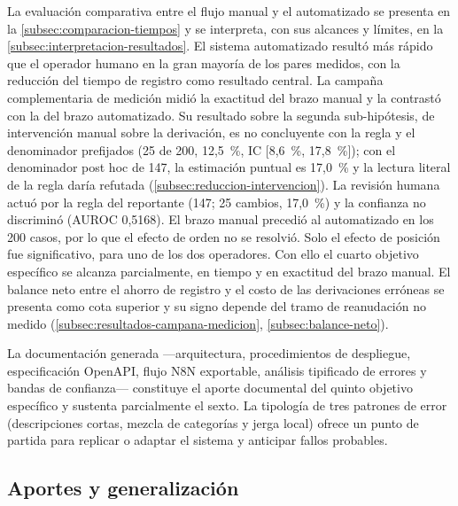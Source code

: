 La evaluación comparativa entre el flujo manual y el automatizado se presenta en la \autoref{subsec:comparacion-tiempos} y se interpreta, con sus alcances y límites, en la \autoref{subsec:interpretacion-resultados}. El sistema automatizado resultó más rápido que el operador humano en la gran mayoría de los pares medidos, con la reducción del tiempo de registro como resultado central. La campaña complementaria de medición midió la exactitud del brazo manual y la contrastó con la del brazo automatizado. Su resultado sobre la segunda sub-hipótesis, de intervención manual sobre la derivación, es no concluyente con la regla y el denominador prefijados (25 de 200, 12,5~\%, IC [8,6~\%, 17,8~\%]); con el denominador post hoc de 147, la estimación puntual es 17,0~\% y la lectura literal de la regla daría refutada (\autoref{subsec:reduccion-intervencion}). La revisión humana actuó por la regla del reportante (147; 25 cambios, 17,0~\%) y la confianza no discriminó (AUROC 0,5168). El brazo manual precedió al automatizado en los 200 casos, por lo que el efecto de orden no se resolvió. Solo el efecto de posición fue significativo, para uno de los dos operadores. Con ello el cuarto objetivo específico se alcanza parcialmente, en tiempo y en exactitud del brazo manual. El balance neto entre el ahorro de registro y el costo de las derivaciones erróneas se presenta como cota superior y su signo depende del tramo de reanudación no medido (\autoref{subsec:resultados-campana-medicion}, \autoref{subsec:balance-neto}).

La documentación generada ---arquitectura, procedimientos de despliegue, especificación OpenAPI, flujo N8N exportable, análisis tipificado de errores y bandas de confianza--- constituye el aporte documental del quinto objetivo específico y sustenta parcialmente el sexto. La tipología de tres patrones de error (descripciones cortas, mezcla de categorías y jerga local) ofrece un punto de partida para replicar o adaptar el sistema y anticipar fallos probables.

\subsection{Aportes y generalización}\label{subsec:aportes-generalizacion}

